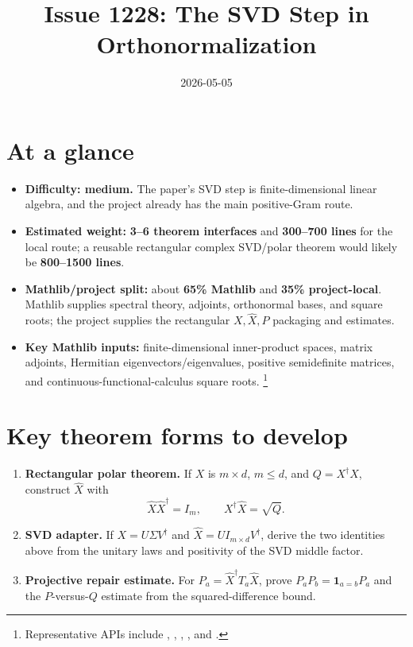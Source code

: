 \documentclass[11pt]{article}
\title{Issue 1228: The SVD Step in Orthonormalization}
\author{}
\date{2026-05-05}
\begin{document}
\maketitle

\section{At a glance}

\begin{itemize}
  \item \textbf{Difficulty: medium.}  The paper's SVD step is finite-dimensional
  linear algebra, and the project already has the main positive-Gram route.
  \item \textbf{Estimated weight:} \textbf{3--6 theorem interfaces} and
  \textbf{300--700 lines} for the local route; a reusable rectangular complex
  SVD/polar theorem would likely be \textbf{800--1500 lines}.
  \item \textbf{Mathlib/project split:} about \textbf{65\% Mathlib} and
  \textbf{35\% project-local}.  Mathlib supplies spectral theory, adjoints,
  orthonormal bases, and square roots; the project supplies the rectangular
  $X,\widehat X,P$ packaging and estimates.
  \item \textbf{Key Mathlib inputs:} finite-dimensional inner-product spaces,
  matrix adjoints, Hermitian eigenvectors/eigenvalues, positive semidefinite
  matrices, and continuous-functional-calculus square roots.%
  \footnote{Representative APIs include ,
  ,
  , , and
  .}
\end{itemize}

\section{Key theorem forms to develop}

\begin{enumerate}
  \item \textbf{Rectangular polar theorem.}  If $X$ is $m\times d$, $m\le d$,
  and $Q=X^\dagger X$, construct $\widehat X$ with
  \[
    \widehat X\widehat X^\dagger=I_m,
    \qquad
    X^\dagger\widehat X=\sqrt Q.
  \]
  \item \textbf{SVD adapter.}  If $X=U\Sigma V^\dagger$ and
  $\widehat X=UI_{m\times d}V^\dagger$, derive the two identities above from
  the unitary laws and positivity of the SVD middle factor.
  \item \textbf{Projective repair estimate.}  For
  $P_a=\widehat X^\dagger T_a\widehat X$, prove $P_aP_b=\mathbf 1_{a=b}P_a$ and
  the $P$-versus-$Q$ estimate from the squared-difference bound.
\end{enumerate}
\end{document}
